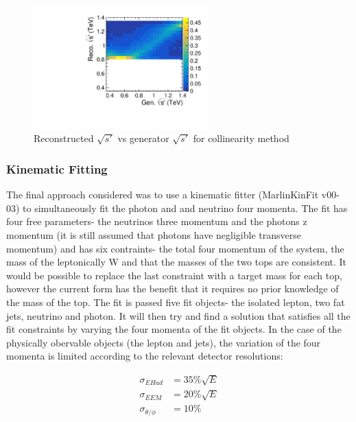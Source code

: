 \begin{figure}
  \centering
  \includegraphics[width=0.6\textwidth]{TopAnalysis/figures/ColEVsTrueE.pdf}
  \caption[Reconstructed $\sqrt{s'}$ vs generator $\sqrt{s'}$ for collinearity method]{Reconstructed $\sqrt{s'}$ vs generator $\sqrt{s'}$ for collinearity method}
  \label{fig:CollinearitySPrime}
\end{figure}

\subsubsection{Kinematic Fitting}

The final approach considered was to use a kinematic fitter (MarlinKinFit v00-03\cite{List:88030}) to simultaneously fit the photon and and neutrino four momenta. The fit has four free parameters- the neutrinos three momentum and the photons z momentum (it is still assumed that photons have negligible transverse momentum) and has six contraints- the total four momentum of the system, the mass of the leptonically W and that the masses of the two tops are consistent. It would be possible to replace the last constraint with a target mass for each top, however the current form has the benefit that it requires no prior knowledge of the mass of the top. The fit is passed five fit objects- the isolated lepton, two fat jets, neutrino and photon.  It will then try and find a solution that satisfies all the fit constraints by varying the four momenta of the fit objects. In the case of the physically obervable objects (the lepton and jets), the variation of the four momenta is limited according to the relevant detector resolutions:

\begin{align}
  \sigma_{E Had}&=35\%\sqrt{E}
  \\
  \sigma_{E EM}&=20\%\sqrt{E}
\\
  \sigma_{\theta/\phi}&=10\%
\end{align}

